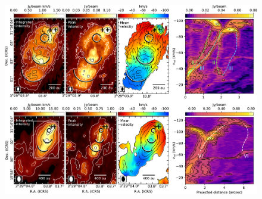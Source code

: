 \documentclass[12pt]{mythesis}
\begin{document}
\begin{figure}[p!]
\begin{center}
\includegraphics[width=\textwidth]{figures/moments.pdf}
\end{center}
 \end{figure}
\end{document}
